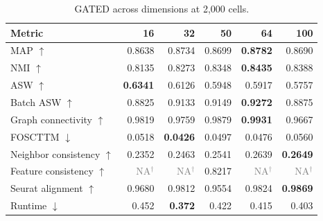 \documentclass[10pt]{article}
\begin{document}
\begin{table}[H]\centering\scriptsize
\caption{GATED across dimensions at 2,000 cells.}
\begin{tabular}{@{}lrrrrr@{}}\toprule
Metric & 16 & 32 & 50 & 64 & 100 \\\midrule
MAP $\uparrow$ & 0.8638 & 0.8734 & 0.8699 & \textbf{0.8782} & 0.8690 \\
NMI $\uparrow$ & 0.8135 & 0.8273 & 0.8348 & \textbf{0.8435} & 0.8388 \\
ASW $\uparrow$ & \textbf{0.6341} & 0.6126 & 0.5948 & 0.5917 & 0.5757 \\
Batch ASW $\uparrow$ & 0.8825 & 0.9133 & 0.9149 & \textbf{0.9272} & 0.8875 \\
Graph connectivity $\uparrow$ & 0.9819 & 0.9759 & 0.9879 & \textbf{0.9931} & 0.9667 \\
FOSCTTM $\downarrow$ & 0.0518 & \textbf{0.0426} & 0.0497 & 0.0476 & 0.0560 \\
Neighbor consistency $\uparrow$ & 0.2352 & 0.2463 & 0.2541 & 0.2639 & \textbf{0.2649} \\
Feature consistency $\uparrow$ & \textcolor{gray}{NA$^{\dagger}$} & \textcolor{gray}{NA$^{\dagger}$} & 0.8217 & \textcolor{gray}{NA$^{\dagger}$} & \textcolor{gray}{NA$^{\dagger}$} \\
Seurat alignment $\uparrow$ & 0.9680 & 0.9812 & 0.9554 & 0.9824 & \textbf{0.9869} \\
Runtime $\downarrow$ & 0.452 & \textbf{0.372} & 0.422 & 0.415 & 0.403 \\
\bottomrule\end{tabular}\end{table}
\end{document}
